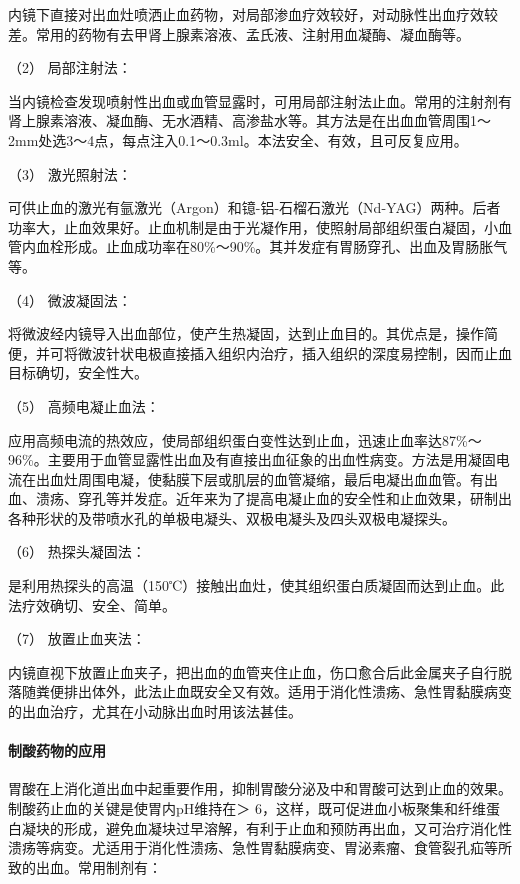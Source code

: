 内镜下直接对出血灶喷洒止血药物，对局部渗血疗效较好，对动脉性出血疗效较差。常用的药物有去甲肾上腺素溶液、孟氏液、注射用血凝酶、凝血酶等。

\hypertarget{text00032.htmlux5cux23CHP1-13-1-5-3-1-2}{}
（2） 局部注射法：

当内镜检查发现喷射性出血或血管显露时，可用局部注射法止血。常用的注射剂有肾上腺素溶液、凝血酶、无水酒精、高渗盐水等。其方法是在出血血管周围1～2mm处选3～4点，每点注入0.1～0.3ml。本法安全、有效，且可反复应用。

\hypertarget{text00032.htmlux5cux23CHP1-13-1-5-3-1-3}{}
（3） 激光照射法：

可供止血的激光有氩激光（Argon）和镱-铝-石榴石激光（Nd-YAG）两种。后者功率大，止血效果好。止血机制是由于光凝作用，使照射局部组织蛋白凝固，小血管内血栓形成。止血成功率在80\%～90\%。其并发症有胃肠穿孔、出血及胃肠胀气等。

\hypertarget{text00032.htmlux5cux23CHP1-13-1-5-3-1-4}{}
（4） 微波凝固法：

将微波经内镜导入出血部位，使产生热凝固，达到止血目的。其优点是，操作简便，并可将微波针状电极直接插入组织内治疗，插入组织的深度易控制，因而止血目标确切，安全性大。

\hypertarget{text00032.htmlux5cux23CHP1-13-1-5-3-1-5}{}
（5） 高频电凝止血法：

应用高频电流的热效应，使局部组织蛋白变性达到止血，迅速止血率达87\%～96\%。主要用于血管显露性出血及有直接出血征象的出血性病变。方法是用凝固电流在出血灶周围电凝，使黏膜下层或肌层的血管凝缩，最后电凝出血血管。有出血、溃疡、穿孔等并发症。近年来为了提高电凝止血的安全性和止血效果，研制出各种形状的及带喷水孔的单极电凝头、双极电凝头及四头双极电凝探头。

\hypertarget{text00032.htmlux5cux23CHP1-13-1-5-3-1-6}{}
（6） 热探头凝固法：

是利用热探头的高温（150℃）接触出血灶，使其组织蛋白质凝固而达到止血。此法疗效确切、安全、简单。

\hypertarget{text00032.htmlux5cux23CHP1-13-1-5-3-1-7}{}
（7） 放置止血夹法：

内镜直视下放置止血夹子，把出血的血管夹住止血，伤口愈合后此金属夹子自行脱落随粪便排出体外，此法止血既安全又有效。适用于消化性溃疡、急性胃黏膜病变的出血治疗，尤其在小动脉出血时用该法甚佳。

\paragraph{制酸药物的应用}

胃酸在上消化道出血中起重要作用，抑制胃酸分泌及中和胃酸可达到止血的效果。制酸药止血的关键是使胃内pH维持在＞
6，这样，既可促进血小板聚集和纤维蛋白凝块的形成，避免血凝块过早溶解，有利于止血和预防再出血，又可治疗消化性溃疡等病变。尤适用于消化性溃疡、急性胃黏膜病变、胃泌素瘤、食管裂孔疝等所致的出血。常用制剂有：

